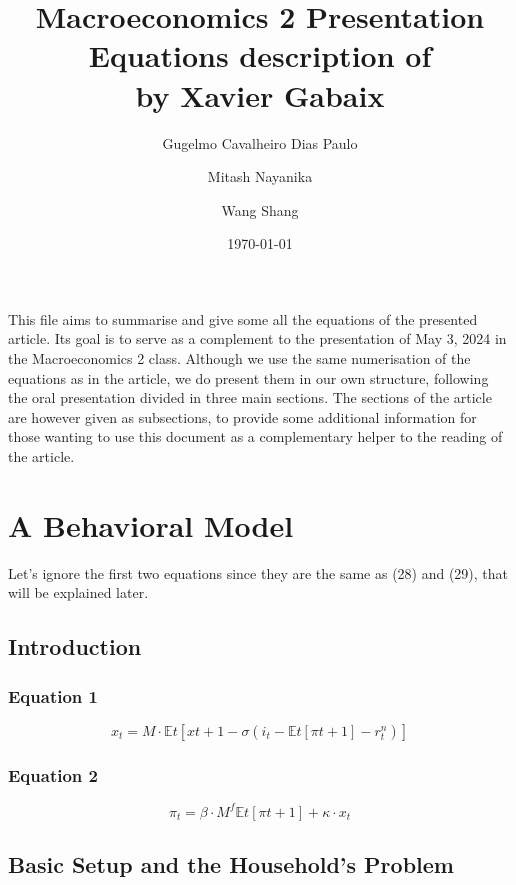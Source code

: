 \documentclass{article}
\title{Macroeconomics 2 Presentation \\ Equations description of \\ \textquote{A Behavioral New Keynesian Model} by Xavier Gabaix}
\author{Gugelmo Cavalheiro Dias Paulo \\ \and Mitash Nayanika \\ \and Wang Shang}
\date{\today}
\begin{document}
\maketitle

This file aims to summarise and give some all the equations of the presented article. Its goal is to serve as a complement to the presentation of May 3, 2024 in the Macroeconomics 2 class. 
Although we use the same numerisation of the equations as in the article, we do present them in our own structure, following the oral presentation divided in three main sections. 
The sections of the article are however given as subsections, to provide some additional information for those wanting to use this document as a complementary helper to the reading of the article.

\pagebreak
\tableofcontents
\pagebreak

\section{A Behavioral Model}
Let's ignore the first two equations since they are the same as (28) and (29), that will be explained later.

\subsection{Introduction}

\subsubsection*{Equation 1}
\begin{equation}
    x_{t}=M\cdot\mathbb{E}{t}\left[ x{t+1} -\sigma (i_{t}-\mathbb{E}t\left[\pi{t+1}\right]-r^{n}_{t})\right]
\end{equation}

\subsubsection*{Equation 2}
\begin{equation}
    \pi_{t}=\beta\cdot M^{f} \mathbb{E}t\left[\pi{t+1}\right]+\kappa\cdot x_{t}
\end{equation}

\subsection{Basic Setup and the Household’s Problem}
\end{document}

